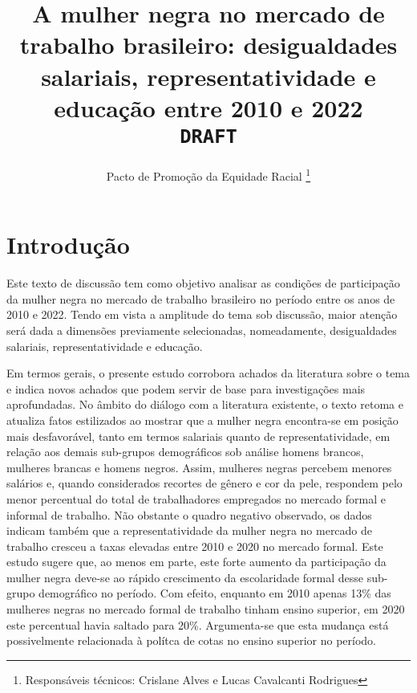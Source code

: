 \documentclass[12pt]{article}
\begin{document}
 

\linespread{1.1}

\title{%
  A mulher negra no mercado de trabalho brasileiro: desigualdades salariais, representatividade e educação entre 2010 e 2022\\
  \vspace{1cm}
  \Large \texttt{\MakeUppercase{DRAFT}}}

\author{Pacto de Promoção da Equidade Racial \thanks{Responsáveis técnicos: Crislane Alves e Lucas Cavalcanti Rodrigues}}


\maketitle

\section{Introdução}

\par Este texto de discussão tem como objetivo analisar as condições de participação da mulher negra no mercado de trabalho brasileiro no período entre os anos de 2010 e 2022. Tendo em vista a amplitude do tema sob discussão, maior atenção será dada a dimensões previamente selecionadas, nomeadamente, desigualdades salariais, representatividade e educação.

\par Em termos gerais, o presente estudo corrobora achados da literatura sobre o tema e indica novos achados que podem servir de base para investigações mais aprofundadas. No âmbito do diálogo com a literatura existente, o texto retoma e atualiza fatos estilizados ao mostrar que a mulher negra encontra-se em posição mais desfavorável, tanto em termos salariais quanto de representatividade, em relação aos demais sub-grupos demográficos sob análise \textemdash homens brancos, mulheres brancas e homens negros. Assim, mulheres negras percebem menores salários e, quando considerados recortes de gênero e cor da pele, respondem pelo menor percentual do total de trabalhadores empregados no mercado formal e informal de trabalho. Não obstante o quadro negativo observado, os dados indicam também que a representatividade da mulher negra no mercado de trabalho cresceu a taxas elevadas entre 2010 e 2020 no mercado formal. Este estudo sugere que, ao menos em parte, este forte aumento da participação da mulher negra deve-se ao rápido crescimento da escolaridade formal desse sub-grupo demográfico no período. Com efeito, enquanto em 2010 apenas 13\% das mulheres negras no mercado formal de trabalho tinham ensino superior, em 2020 este percentual havia saltado para 20\%. Argumenta-se que esta mudança está possivelmente relacionada à polítca de cotas no ensino superior no período.
\end{document}
